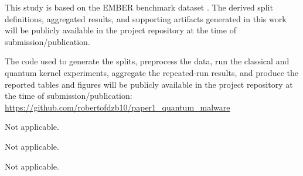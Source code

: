 \documentclass[pdflatex,sn-mathphys-num]{sn-jnl}%
\theoremstyle{thmstyleone}%
\theoremstyle{thmstyletwo}%
\theoremstyle{thmstylethree}%
\begin{document}
This study is based on the EMBER benchmark dataset \cite{anderson2018ember}. The derived split definitions, aggregated results, and supporting artifacts generated in this work will be publicly available in the project repository at the time of submission/publication.

The code used to generate the splits, preprocess the data, run the classical and quantum kernel experiments, aggregate the repeated-run results, and produce the reported tables and figures will be publicly available in the project repository at the time of submission/publication: \url{https://github.com/robertofdzb10/paper1_quantum_malware}

Not applicable.

Not applicable.

Not applicable.




\clearpage
\end{document}
